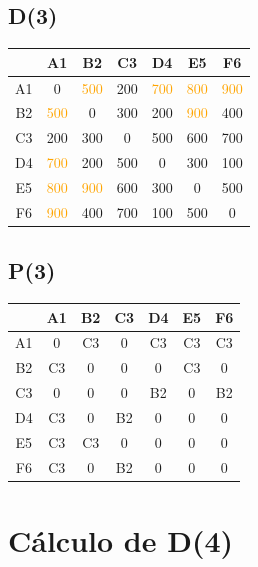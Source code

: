 \documentclass[a4paper,11pt]{article}
\begin{document}
\subsection*{D(3)}
\begin{center}
\begin{tabular}{c|cccccc}
 & A1 & B2 & C3 & D4 & E5 & F6 \\ \hline
A1 & 0 & \textcolor{orange}{500} & 200 & \textcolor{orange}{700} & \textcolor{orange}{800} & \textcolor{orange}{900} \\
B2 & \textcolor{orange}{500} & 0 & 300 & 200 & \textcolor{orange}{900} & 400 \\
C3 & 200 & 300 & 0 & 500 & 600 & 700 \\
D4 & \textcolor{orange}{700} & 200 & 500 & 0 & 300 & 100 \\
E5 & \textcolor{orange}{800} & \textcolor{orange}{900} & 600 & 300 & 0 & 500 \\
F6 & \textcolor{orange}{900} & 400 & 700 & 100 & 500 & 0 \\
\end{tabular}
\end{center}
\subsection*{P(3)}
\begin{center}
\begin{tabular}{c|cccccc}
 & A1 & B2 & C3 & D4 & E5 & F6 \\ \hline
A1 & 0 & C3 & 0 & C3 & C3 & C3 \\
B2 & C3 & 0 & 0 & 0 & C3 & 0 \\
C3 & 0 & 0 & 0 & B2 & 0 & B2 \\
D4 & C3 & 0 & B2 & 0 & 0 & 0 \\
E5 & C3 & C3 & 0 & 0 & 0 & 0 \\
F6 & C3 & 0 & B2 & 0 & 0 & 0 \\
\end{tabular}
\end{center}
\newpage
\section*{Cálculo de D(4)}
\end{document}
